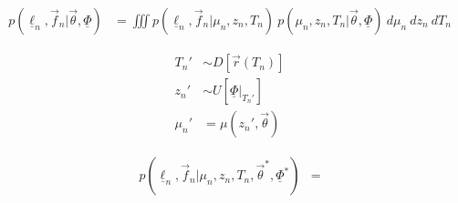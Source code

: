 \documentclass[12pt, onecolumn]{emulateapj}
\newcommand{\textul}{\underline}
\begin{document}
\begin{align}
p(\textul{\ell}_{n}, \vec{f}_{n} | \vec{\theta}, \textul{\Phi}) &= \iiint p(\textul{\ell}_{n}, \vec{f}_{n} | \mu_{n}, z_{n}, T_{n})\ p(\mu_{n}, z_{n}, T_{n} | \vec{\theta}, \textul{\Phi})\ d\mu_{n}\ dz_{n}\ dT_{n}
\end{align}

\begin{align}
T_{n}' &\sim D[\vec{r}(T_{n})]\\
z_{n}' &\sim U[\textul{\Phi}|_{T_{n}'}]\\
\mu_{n}' &= \mu(z_{n}', \vec{\theta})
\end{align}

\begin{align}
p(\textul{\ell}_{n}, \vec{f}_{n} | \mu_{n}, z_{n}, T_{n}, \vec{\theta}^{*}, \textul{\Phi}^{*}) &= 
\end{align}




\end{document}
